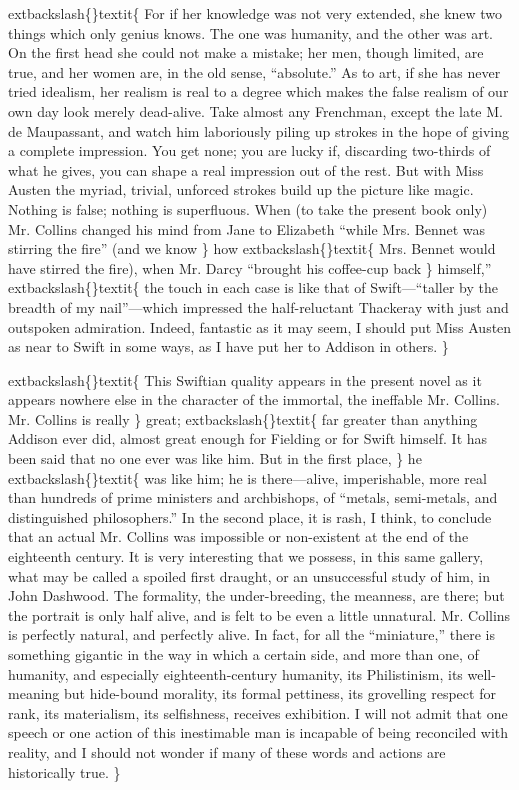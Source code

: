 \documentclass[10pt]{book}
\begin{document}
	extbackslash\{\}textit\{
    For if her knowledge was not very extended, she knew two things which
only genius knows. The one was humanity, and the other was art. On the
first head she could not make a mistake; her men, though limited, are
true, and her women are, in the old sense, “absolute.” As to art, if she
has never tried idealism, her realism is real to a degree which makes
the false realism of our own day look merely dead-alive. Take almost any
Frenchman, except the late M. de Maupassant, and watch him laboriously
piling up strokes in the hope of giving a complete impression. You get
none; you are lucky if, discarding two-thirds of what he gives, you can
shape a real impression out of the rest. But with Miss Austen the
myriad, trivial, unforced strokes build up the picture like magic.
Nothing is false; nothing is superfluous. When (to take the present book
only) Mr. Collins changed his mind from Jane to Elizabeth “while Mrs.
Bennet was stirring the fire” (and we know
   \}
   how
   	extbackslash\{\}textit\{
    Mrs. Bennet would have
stirred the fire), when Mr. Darcy “brought his coffee-cup back
   \}
   himself,”
   	extbackslash\{\}textit\{
    the touch in each case is like that of Swift—“taller by the
breadth of my nail”—which impressed the half-reluctant Thackeray with
just and outspoken admiration. Indeed, fantastic as it may seem, I
should put Miss Austen as near to Swift in some ways, as I have put her
to Addison in others.
   \}

	extbackslash\{\}textit\{
    This Swiftian quality appears in the present novel as it appears
nowhere else in the character of the immortal, the ineffable Mr.
Collins. Mr. Collins is really
   \}
   great;
   	extbackslash\{\}textit\{
    far greater than anything Addison
ever did, almost great enough for Fielding or for Swift himself. It has
been said that no one ever was like him. But in the first
    place,
   \}
   he
   	extbackslash\{\}textit\{
    was like him; he is there—alive, imperishable, more real than hundreds
of prime ministers and archbishops, of “metals, semi-metals, and
distinguished philosophers.” In the second place, it is rash, I think,
to conclude that an actual Mr. Collins was impossible or non-existent at
the end of the eighteenth century. It is very interesting that we
possess, in this same gallery, what may be called a spoiled first
draught, or an unsuccessful study of him, in John Dashwood. The
formality, the under-breeding, the meanness, are there; but the portrait
is only half alive, and is felt to be even a little unnatural. Mr.
Collins is perfectly natural, and perfectly alive. In fact, for all the
“miniature,” there is something gigantic in the way in which a certain
side, and more than one, of humanity, and especially eighteenth-century
humanity, its Philistinism, its well-meaning but hide-bound morality,
its formal pettiness, its grovelling respect for rank, its materialism,
its selfishness, receives exhibition. I will not admit that one speech
or one action of this inestimable man is incapable of being reconciled
with reality, and I should not wonder if many of these words and actions
are historically true.
   \}
\end{document}
